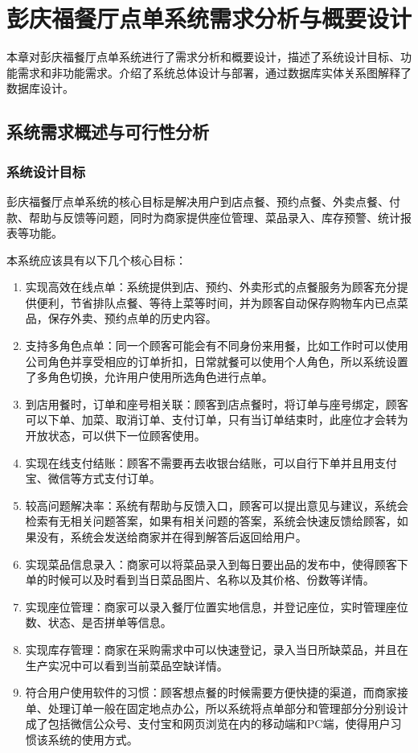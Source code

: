 \chapter{彭庆福餐厅点单系统需求分析与概要设计}
本章对彭庆福餐厅点单系统进行了需求分析和概要设计，描述了系统设计目标、功能需求和非功能需求。介绍了系统总体设计与部署，通过数据库实体关系图解释了数据库设计。
\section{系统需求概述与可行性分析}
\subsection{系统设计目标}
彭庆福餐厅点单系统的核心目标是解决用户到店点餐、预约点餐、外卖点餐、付款、帮助与反馈等问题，同时为商家提供座位管理、菜品录入、库存预警、统计报表等功能。

本系统应该具有以下几个核心目标：
\begin{enumerate}
  \item 实现高效在线点单：系统提供到店、预约、外卖形式的点餐服务为顾客充分提供便利，节省排队点餐、等待上菜等时间，并为顾客自动保存购物车内已点菜品，保存外卖、预约点单的历史内容。
  \item 支持多角色点单：同一个顾客可能会有不同身份来用餐，比如工作时可以使用公司角色并享受相应的订单折扣，日常就餐可以使用个人角色，所以系统设置了多角色切换，允许用户使用所选角色进行点单。
  \item 到店用餐时，订单和座号相关联：顾客到店点餐时，将订单与座号绑定，顾客可以下单、加菜、取消订单、支付订单，只有当订单结束时，此座位才会转为开放状态，可以供下一位顾客使用。
  \item 实现在线支付结账：顾客不需要再去收银台结账，可以自行下单并且用支付宝、微信等方式支付订单。
  \item 较高问题解决率：系统有帮助与反馈入口，顾客可以提出意见与建议，系统会检索有无相关问题答案，如果有相关问题的答案，系统会快速反馈给顾客，如果没有，系统会发送给商家并在得到解答后返回给用户。
  \item 实现菜品信息录入：商家可以将菜品录入到每日要出品的发布中，使得顾客下单的时候可以及时看到当日菜品图片、名称以及其价格、份数等详情。
  \item 实现座位管理：商家可以录入餐厅位置实地信息，并登记座位，实时管理座位数、状态、是否拼单等信息。
  \item 实现库存管理：商家在采购需求中可以快速登记，录入当日所缺菜品，并且在生产实况中可以看到当前菜品空缺详情。
  \item 符合用户使用软件的习惯：顾客想点餐的时候需要方便快捷的渠道，而商家接单、处理订单一般在固定地点办公，所以系统将点单部分和管理部分分别设计成了包括微信公众号、支付宝和网页浏览在内的移动端和PC端，使得用户习惯该系统的使用方式。
\end{enumerate}

